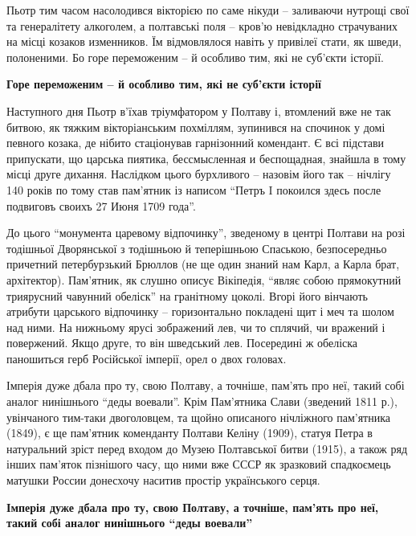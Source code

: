 Пьотр тим часом насолодився вікторією по саме нікуди – заливаючи нутрощі свої
та генералітету алкоголем, а полтавські поля – кров'ю невідкладно страчуваних
на місці козаков изменников. Їм відмовлялося навіть у привілеї стати, як шведи,
полоненими. Бо горе переможеним – й особливо тим, які не суб'єкти історії.

\begin{leftbar}
	\bfseries
Горе переможеним – й особливо тим, які не суб'єкти історії
\end{leftbar}

Наступного дня Пьотр в'їхав тріумфатором у Полтаву і, втомлений вже не так
битвою, як тяжким вікторіанським похміллям, зупинився на спочинок у домі
певного козака, де нібито стаціонував гарнізонний комендант. Є всі підстави
припускати, що царська пиятика, бессмысленная и беспощадная, знайшла в тому
місці друге дихання. Наслідком цього бурхливого – назовім його так – нічлігу
140 років по тому став пам'ятник із написом \enquote{Петръ I покоился здесь после
подвиговъ своихъ 27 Июня 1709 года}.

До цього \enquote{монумента царевому відпочинку}, зведеному в центрі Полтави на розі
тодішньої Дворянської з тодішньою й теперішньою Спаською, безпосередньо
причетний петербурзький Брюллов (не ще один знаний нам Карл, а Карла брат,
архітектор). Пам'ятник, як слушно описує Вікіпедія, \enquote{являє собою прямокутний
триярусний чавунний обеліск} на гранітному цоколі. Вгорі його вінчають атрибути
царського відпочинку – горизонтально покладені щит і меч та шолом над ними. На
нижньому ярусі зображений лев, чи то сплячий, чи вражений і повержений. Якщо
друге, то він шведський лев. Посередині ж обеліска паношиться герб Російської
імперії, орел о двох головах.

Імперія дуже дбала про ту, свою Полтаву, а точніше, пам'ять про неї, такий собі
аналог нинішнього \enquote{деды воевали}. Крім Пам'ятника Слави (зведений 1811 р.),
увінчаного тим-таки двоголовцем, та щойно описаного нічліжного пам'ятника
(1849), є ще пам'ятник коменданту Полтави Келіну (1909), статуя Петра в
натуральний зріст перед входом до Музею Полтавської битви (1915), а також ряд
інших пам'яток пізнішого часу, що ними вже СССР як зразковий спадкоємець
матушки России донесхочу наситив простір українського серця.

\begin{leftbar}
	\bfseries
Імперія дуже дбала про ту, свою Полтаву, а точніше, пам'ять про неї, такий собі
аналог нинішнього \enquote{деды воевали}
\end{leftbar}

